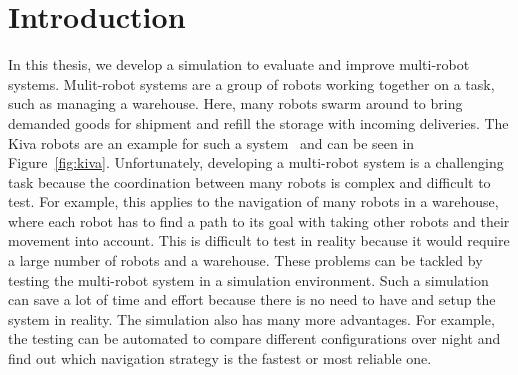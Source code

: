 \chapter{Introduction}

In this thesis, we develop a simulation to evaluate and improve multi-robot systems. Mulit-robot systems are a group of robots working together on a task, such as managing a warehouse. Here, many robots swarm around to bring demanded goods for shipment and refill the storage with incoming deliveries. The Kiva robots are an example for such a system~\cite{Kiva} and can be seen in Figure~\ref{fig:kiva}. Unfortunately, developing a multi-robot system is a challenging task because the coordination between many robots is complex and difficult to test. For example, this applies to the navigation of many robots in a warehouse, where each robot has to find a path to its goal with taking other robots and their movement into account. This is difficult to test in reality because it would require a large number of robots and a warehouse. These problems can be tackled by testing the multi-robot system in a simulation environment. Such a simulation can save a lot of time and effort because there is no need to have and setup the system in reality. The simulation also has many more advantages. For example, the testing can be automated to compare different configurations over night and find out which navigation strategy is the fastest or most reliable one.\\
